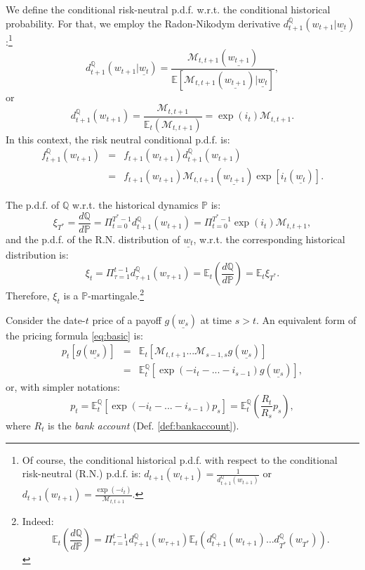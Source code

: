 \documentclass[
  12pt,
]{book}
\theoremstyle{definition}
\theoremstyle{definition}
\theoremstyle{definition}
\theoremstyle{definition}
\theoremstyle{remark}
\begin{document}
We define the conditional risk-neutral p.d.f. w.r.t. the conditional historical probability. For that, we employ the Radon-Nikodym derivative \(d^{\mathbb{Q}}_{t+1}(w_{t+1}|\underline{w_t})\):\footnote{Of course, the conditional historical p.d.f. with respect to the conditional risk-neutral (R.N.) p.d.f. is:
  \(d_{t+1}(w_{t+1}) = \frac{1}{d^{\mathbb{Q}}_{t+1}(w_{t+1})}\) or \(d_{t+1}(w_{t+1}) = \frac{\exp(-i_{t})}{\mathcal{M}_{t,t+1}}\).}
\begin{equation}
d^{\mathbb{Q}}_{t+1}(w_{t+1}|\underline{w_t}) =
\frac{\mathcal{M}_{t,t+1}(\underline{w_{t+1}})}{\mathbb{E}[\mathcal{M}_{t,t+1}(\underline{w_{t+1}})|\underline{w_t}]},\label{eq:RadonNikodym}
\end{equation}
or
\[
d^{\mathbb{Q}}_{t+1}(w_{t+1})=
\frac{\mathcal{M}_{t,t+1}}{\mathbb{E}_t(\mathcal{M}_{t,t+1})}=\exp(i_{t}) \mathcal{M}_{t,t+1}.
\]
In this context, the risk neutral conditional p.d.f. is:
\begin{eqnarray}
f^{\mathbb{Q}}_{t+1}(w_{t+1}) &=& f_{t+1}(w_{t+1})d^{\mathbb{Q}}_{t+1}(w_{t+1}) \nonumber \\
&=&f_{t+1} (w_{t+1}) \mathcal{M}_{t,t+1} (\underline{w_{t+1}}) \exp [i_{t} (\underline{w_t})].\label{eq:fQfP}
\end{eqnarray}

The p.d.f. of \(\mathbb{Q}\) w.r.t. the historical dynamics \(\mathbb{P}\) is:
\[
\xi_{T^*} =  \frac{d\mathbb{Q}}{d\mathbb{P}} =
\Pi^{T^{*}-1}_{t=0} d^{\mathbb{Q}}_{t+1}(w_{t+1}) =
\Pi^{T^{*}-1}_{t=0} \exp(i_{t}) \mathcal{M}_{t,t+1},
\]
and the p.d.f. of the R.N. distribution of \(\underline{w_t}\), w.r.t. the corresponding historical distribution is:
\[
\xi_t= \Pi^{t-1}_{\tau=1}
d^{\mathbb{Q}}_{\tau+1}(w_{\tau+1})=\mathbb{E}_t\left(\frac{d\mathbb{Q}}{d\mathbb{P}}\right) = \mathbb{E}_t\xi_{T^*}.
\]
Therefore, \(\xi_t\) is a \(\mathbb{P}\)-martingale.\footnote{Indeed:
  \[
  \mathbb{E}_t \left( \frac{d\mathbb{Q}}{d\mathbb{P}}\right) = \Pi^{t-1}_{\tau = 1} d^{\mathbb{Q}}_{\tau + 1} (w_{\tau+1}) \mathbb{E}_t \left( d^{\mathbb{Q}}_{t+1} (w_{t+1}) \ldots d^{\mathbb{Q}}_{T^*} (w_{T^*})\right).
  \]}

Consider the date-\(t\) price of a payoff \(g(\underline{w_s})\) at time \(s>t\). An equivalent form of the pricing formula \eqref{eq:basic} is:
\begin{eqnarray*}
p_t[g(\underline{w_s})] &=& \mathbb{E}_t[\mathcal{M}_{t,t+1}...\mathcal{M}_{s-1,s}g(\underline{w_s})] \\
&=& \mathbb{E}^{\mathbb{Q}}_t[\exp(-i_{t}-...-i_{s-1})g(\underline{w_s})],
\end{eqnarray*}
or, with simpler notations:
\[
p_t = \mathbb{E}^{\mathbb{Q}}_t[\exp(-i_{t}-...-i_{s-1})p_s] = \mathbb{E}^{\mathbb{Q}}_t\left(\frac{R_t}{R_s} p_s\right),
\]
where \(R_t\) is the \emph{bank account} (Def. \ref{def:bankaccount}).
\end{document}
